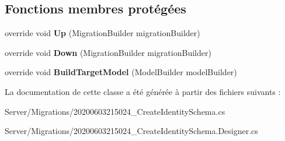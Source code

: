 \subsection*{Fonctions membres protégées}
\begin{DoxyCompactItemize}
\item 
\mbox{\label{class_mediwatch_1_1_server_1_1_migrations_1_1_create_identity_schema_af27fb6934eb330070ffedbc16f86db56}} 
override void {\bfseries Up} (Migration\+Builder migration\+Builder)
\item 
\mbox{\label{class_mediwatch_1_1_server_1_1_migrations_1_1_create_identity_schema_a3ac3c568ce46aa23653401cef751a783}} 
override void {\bfseries Down} (Migration\+Builder migration\+Builder)
\item 
\mbox{\label{class_mediwatch_1_1_server_1_1_migrations_1_1_create_identity_schema_a9bd821ce7f0eb2d258b7a181a4ff02b3}} 
override void {\bfseries Build\+Target\+Model} (Model\+Builder model\+Builder)
\end{DoxyCompactItemize}


La documentation de cette classe a été générée à partir des fichiers suivants \+:\begin{DoxyCompactItemize}
\item 
Server/\+Migrations/20200603215024\+\_\+\+Create\+Identity\+Schema.\+cs\item 
Server/\+Migrations/20200603215024\+\_\+\+Create\+Identity\+Schema.\+Designer.\+cs\end{DoxyCompactItemize}
